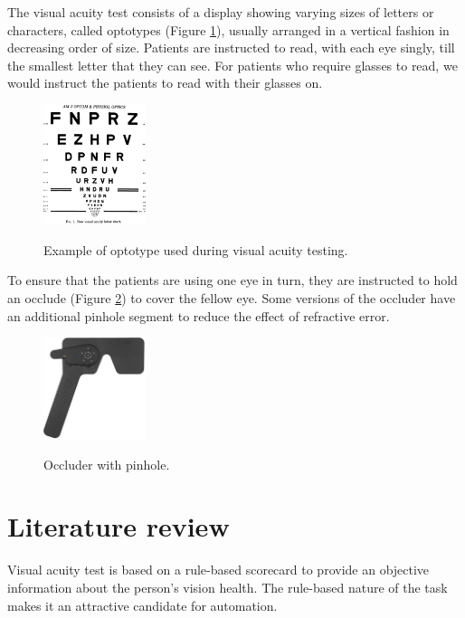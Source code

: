\documentclass{article}
\begin{document}
The visual acuity test consists of a display showing varying sizes of letters or characters, called optotypes (Figure \ref{optotype}), usually arranged in a vertical fashion in decreasing order of size. Patients are instructed to read, with each eye singly, till the smallest letter that they can see. For patients who require glasses to read, we would instruct the patients to read with their glasses on.
\begin{figure}[tbh]
    \begin{center}
        \includegraphics[width=3cm]{optotype.png}\
        \caption{Example of optotype used during visual acuity testing.\label{optotype}} 
    \end{center}

\end{figure}

To ensure that the patients are using one eye in turn, they are instructed to hold an occlude (Figure \ref{occluder}) to cover the fellow eye. Some versions of the occluder have an additional pinhole segment to reduce the effect of refractive error.
\begin{figure}[tbh]
    \begin{center}
        \includegraphics[width=3cm]{occuluder.jpg}\
        \caption{Occluder with pinhole. \label{occluder}} 
    \end{center}
\end{figure}
\section{Literature review}
Visual acuity test is based on a rule-based scorecard to provide an objective information about the person's vision health. The rule-based nature of the task makes it an attractive candidate for automation.
\end{document}
